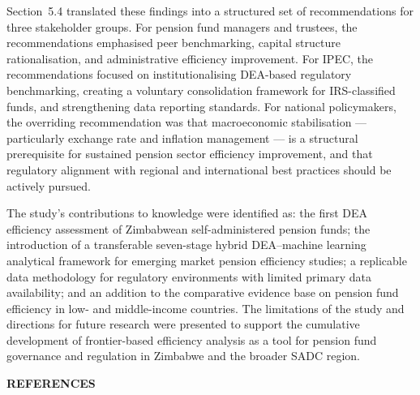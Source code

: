 \documentclass[12pt,a4paper]{article}
\begin{document}
Section~5.4 translated these findings into a structured set of recommendations for three stakeholder groups. For pension fund managers and trustees, the recommendations emphasised peer benchmarking, capital structure rationalisation, and administrative efficiency improvement. For IPEC, the recommendations focused on institutionalising DEA-based regulatory benchmarking, creating a voluntary consolidation framework for IRS-classified funds, and strengthening data reporting standards. For national policymakers, the overriding recommendation was that macroeconomic stabilisation --- particularly exchange rate and inflation management --- is a structural prerequisite for sustained pension sector efficiency improvement, and that regulatory alignment with regional and international best practices should be actively pursued.

The study's contributions to knowledge were identified as: the first DEA efficiency assessment of Zimbabwean self-administered pension funds; the introduction of a transferable seven-stage hybrid DEA--machine learning analytical framework for emerging market pension efficiency studies; a replicable data methodology for regulatory environments with limited primary data availability; and an addition to the comparative evidence base on pension fund efficiency in low- and middle-income countries. The limitations of the study and directions for future research were presented to support the cumulative development of frontier-based efficiency analysis as a tool for pension fund governance and regulation in Zimbabwe and the broader SADC region.

\newpage

\newpage
\begin{center}
    {\LARGE\bfseries REFERENCES}
\end{center}

\vspace{0.5cm}
\end{document}
